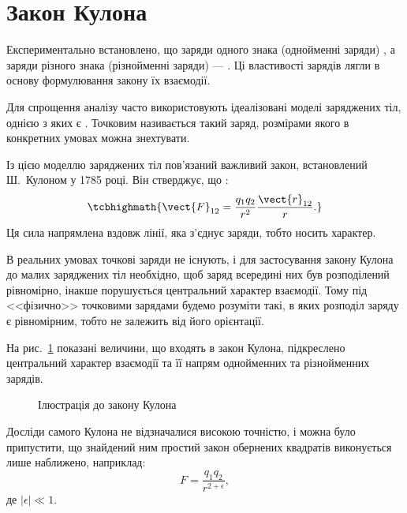 \section{Закон Кулона}


Експериментально встановлено, що заряди одного знака (однойменні заряди) , а заряди різного знака (різнойменні заряди) ---
. Ці властивості зарядів лягли в основу формулювання закону їх взаємодії.


Для спрощення аналізу часто використовують ідеалізовані моделі заряджених тіл, однією з яких є . Точковим називається такий заряд,
розмірами якого в конкретних умовах можна знехтувати.

Із цією моделлю заряджених тіл пов'язаний важливий закон, встановлений Ш.~Кулоном у 1785 році. Він стверджує, що :
\begin{equation}\label{eq:ColumbLaw}
	\tcbhighmath{
		\vect{F}_{12} = \frac{q_1 q_2}{r^2}\frac{\vect{r}_{12}}{r}.
	}
\end{equation}
Ця сила напрямлена вздовж лінії, яка з'єднує заряди, тобто носить  характер.
\begin{Attention}
    В реальних умовах точкові заряди не існують, і для застосування закону Кулона до малих заряджених тіл необхідно, щоб заряд всередині них був
    розподілений рівномірно, інакше порушується центральний характер взаємодії. Тому під <<фізично>> точковими зарядами будемо розуміти такі, в яких
    розподіл заряду
    є рівномірним,
    тобто не залежить від його орієнтації.
\end{Attention}

На рис.~\ref{pic:Columb} показані величини, що входять в закон Кулона, підкреслено центральний характер взаємодії та її напрям однойменних та
різнойменних зарядів.


\begin{figure}
	\centering
	\caption{Ілюстрація до закону Кулона}
    \label{pic:Columb}
\end{figure}

Досліди самого Кулона не відзначалися високою точністю, і можна було припустити, що знайдений ним простий закон обернених квадратів виконується лише
наближено, наприклад:
\begin{equation*}
	F = \frac{q_1 q_2}{r^{2 + \epsilon}},
\end{equation*}
де $|\epsilon| \ll 1$.

